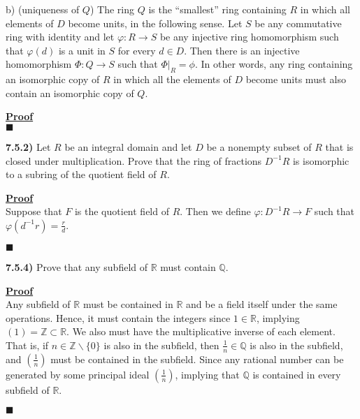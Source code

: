 \documentclass[12pt,a4paper]{article}
\newcommand{\prob}[2]{\textbf{#1)} #2}
\newenvironment{proof}
{
\textbf{\underline{Proof}} \\
}
{
\hfill $\blacksquare$
}
\begin{document}
b) (uniqueness of $Q$) The ring $Q$ is the ``smallest'' ring containing $R$ in which all elements of $D$ become units, in the following sense.
Let $S$ be any commutative ring with identity and let $\varphi: R \to S$ be any injective ring homomorphism such that $\varphi(d)$ is a unit in $S$ for every $d \in D$.
Then there is an injective homomorphism $\Phi: Q \to S$ such that $\Phi |_{R} = \phi$.
In other words, any ring containing an isomorphic copy of $R$ in which all the elements of $D$ become units must also contain an isomorphic copy of $Q$.

\begin{proof}
    
\end{proof}

\prob{7.5.2}{
Let $R$ be an integral domain and let $D$ be a nonempty subset of $R$ that is closed under multiplication.
Prove that the ring of fractions $D^{-1}R$ is isomorphic to a subring of the quotient field of $R$.
}

\begin{proof}
    Suppose that $F$ is the quotient field of $R$.
    Then we define $\varphi: D^{-1}R \to F$ such that $\varphi(d^{-1}r) = \frac{r}{d}$.
     
\end{proof}

\prob{7.5.4}{
Prove that any subfield of $\mathbb{R}$ must contain $\mathbb{Q}$.
}
 
\begin{proof}
    Any subfield of $\mathbb{R}$ must be contained in $\mathbb{R}$ and be a field itself under the same operations.
    Hence, it must contain the integers since $1 \in \mathbb{R}$, implying $(1) = \mathbb{Z} \subset \mathbb{R}$.
    We also must have the multiplicative inverse of each element.
    That is, if $n \in \mathbb{Z} \backslash \{ 0 \} $ is also in the subfield, then $\frac{1}{n} \in \mathbb{Q}$ is also in the subfield, and $\left( \frac{1}{n} \right)$ must be contained in the subfield.
    Since any rational number can be generated by some principal ideal $\left( \frac{1}{n} \right)$, implying that $\mathbb{Q}$ is contained in every subfield of $\mathbb{R}$.
\end{proof}
\end{document}
